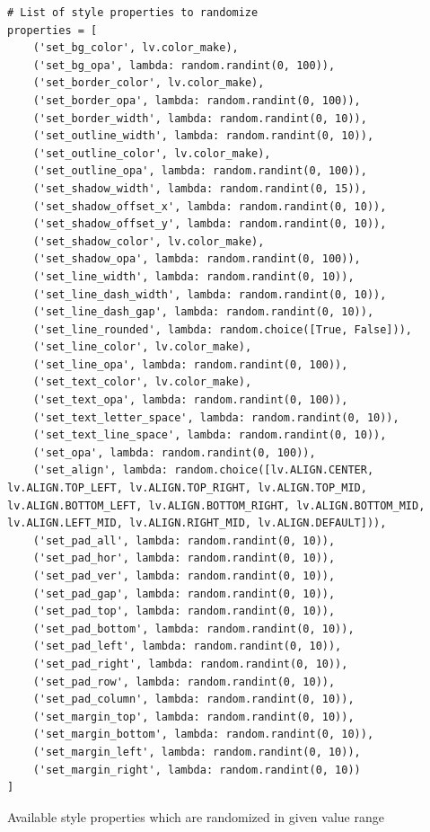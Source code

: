 \documentclass[Bachelor, BIC, english, fhCitStyle, IEEE]{BASE/twbook} %
\begin{document}
\begin{listing}[htbp]
    \begin{verbatim}
# List of style properties to randomize
properties = [
    ('set_bg_color', lv.color_make),
    ('set_bg_opa', lambda: random.randint(0, 100)),
    ('set_border_color', lv.color_make),
    ('set_border_opa', lambda: random.randint(0, 100)),
    ('set_border_width', lambda: random.randint(0, 10)),
    ('set_outline_width', lambda: random.randint(0, 10)),
    ('set_outline_color', lv.color_make),
    ('set_outline_opa', lambda: random.randint(0, 100)),
    ('set_shadow_width', lambda: random.randint(0, 15)),
    ('set_shadow_offset_x', lambda: random.randint(0, 10)),
    ('set_shadow_offset_y', lambda: random.randint(0, 10)),
    ('set_shadow_color', lv.color_make),
    ('set_shadow_opa', lambda: random.randint(0, 100)),
    ('set_line_width', lambda: random.randint(0, 10)),
    ('set_line_dash_width', lambda: random.randint(0, 10)),
    ('set_line_dash_gap', lambda: random.randint(0, 10)),
    ('set_line_rounded', lambda: random.choice([True, False])),
    ('set_line_color', lv.color_make),
    ('set_line_opa', lambda: random.randint(0, 100)),
    ('set_text_color', lv.color_make),
    ('set_text_opa', lambda: random.randint(0, 100)),
    ('set_text_letter_space', lambda: random.randint(0, 10)),
    ('set_text_line_space', lambda: random.randint(0, 10)),
    ('set_opa', lambda: random.randint(0, 100)),
    ('set_align', lambda: random.choice([lv.ALIGN.CENTER, lv.ALIGN.TOP_LEFT, lv.ALIGN.TOP_RIGHT, lv.ALIGN.TOP_MID, lv.ALIGN.BOTTOM_LEFT, lv.ALIGN.BOTTOM_RIGHT, lv.ALIGN.BOTTOM_MID, lv.ALIGN.LEFT_MID, lv.ALIGN.RIGHT_MID, lv.ALIGN.DEFAULT])),
    ('set_pad_all', lambda: random.randint(0, 10)),
    ('set_pad_hor', lambda: random.randint(0, 10)),
    ('set_pad_ver', lambda: random.randint(0, 10)),
    ('set_pad_gap', lambda: random.randint(0, 10)),
    ('set_pad_top', lambda: random.randint(0, 10)),
    ('set_pad_bottom', lambda: random.randint(0, 10)),
    ('set_pad_left', lambda: random.randint(0, 10)),
    ('set_pad_right', lambda: random.randint(0, 10)),
    ('set_pad_row', lambda: random.randint(0, 10)),
    ('set_pad_column', lambda: random.randint(0, 10)),
    ('set_margin_top', lambda: random.randint(0, 10)),
    ('set_margin_bottom', lambda: random.randint(0, 10)),
    ('set_margin_left', lambda: random.randint(0, 10)),
    ('set_margin_right', lambda: random.randint(0, 10))
]
    \end{verbatim}
    \caption{Available style properties which are randomized in given value range}
    \label{code:randomized-properties}
\end{listing}
\end{document}
